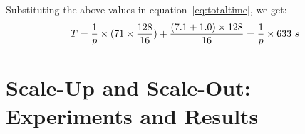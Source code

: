 \documentclass{rspublic}
\newcommand{\jhanote}[1]{ {\textcolor{red} { ***shantenu: #1 }}}
\newcommand{\alnote}[1]{ {\textcolor{blue} { ***andre: #1 }}}
\newcommand{\athotanote}[1]{ {\textcolor{green} { ***athota: #1 }}}
\newcommand{\alnote}[1]{}
\newcommand{\athotanote}[1]{}
\newcommand{\jhanote}[1]{}
\begin{document}

Substituting the above values in equation~\ref{eq:totaltime}, we get:
\begin{eqnarray}
T=  {1 \over p} \times {{(71\times {128\over 16}}) + {(7.1+1.0)\times 128\over 16}} = {1 \over p} \times 633~s
\label{eq:decent}
\end{eqnarray}





\section{Scale-Up and Scale-Out: Experiments and Results}
\label{sec:performance}
\end{document}

